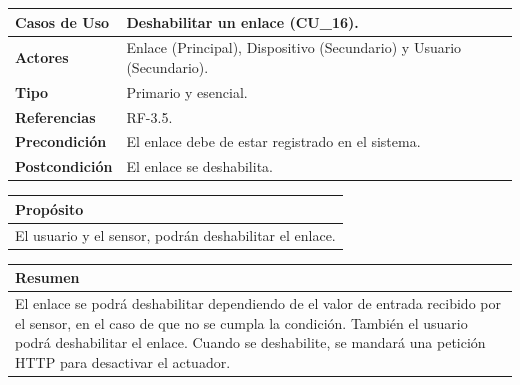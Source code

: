 \begin{itemize}
    \begin{table}[h!]
        \centering
        \begin{tabular}{|l|p{}|}
            \hline
            \textbf{Casos de Uso}   &   Deshabilitar un enlace (CU\_16). \\
            \hline 
            \textbf{Actores}        &   Enlace (Principal), Dispositivo (Secundario) y Usuario (Secundario). \\ 
            \hline 
            \textbf{Tipo}           &   Primario y esencial. \\
            \hline
            \textbf{Referencias}    &   RF-3.5. \\ 
            \hline
            \textbf{Precondición}   &   El enlace debe de estar registrado en el sistema. \\ 
            \hline
            \textbf{Postcondición}  &   El enlace se deshabilita. \\ 
            \hline
        \end{tabular}
        
        \vspace{5mm}
        
        \begin{tabular}{|p{\textwidth}|}
            \hline
            \rowcolor{SeaGreen} \textbf{Propósito} \\
            \hline
            \multicolumn{1}{|p{12cm}|}{El usuario y el sensor, podrán deshabilitar el enlace.} \\ [0.5ex]
            \hline
        \end{tabular}
        
        \vspace{5mm}
        
        \begin{tabular}{|p{\textwidth}|}
            \hline
            \rowcolor{SeaGreen} \textbf{Resumen} \\
            \hline
            \multicolumn{1}{|p{12cm}|}{El enlace se podrá deshabilitar dependiendo de el valor de entrada recibido por el
            sensor, en el caso de que no se cumpla la condición. También el usuario podrá deshabilitar el enlace. Cuando se 
            deshabilite, se mandará una petición HTTP para desactivar el actuador.} \\ [0.5ex]
            \hline
        \end{tabular}
        
        \vspace{5mm}
        

\end{table}
\end{itemize}
